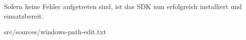             Sofern keine Fehler aufgetreten sind, ist das SDK nun erfolgreich
            installiert und einsatzbereit.

            
                             {src/sources/windows-path-edit.txt}

